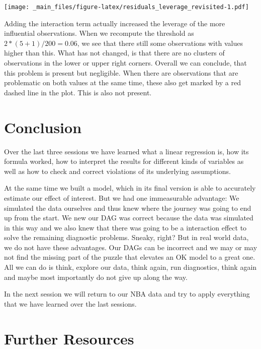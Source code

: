\documentclass[
]{book}
\begin{document}
\texttt{[image: \_main\_files/figure-latex/residuals\_leverage\_revisited-1.pdf]}

Adding the interaction term actually increased the leverage of the more
influential observations. When we recompute the threshold as
\(2 * (5 + 1) / 200 = 0.06\), we see that there still some observations with
values higher than this. What has not changed, is that there are no clusters
of observations in the lower or upper right corners. Overall we can conclude,
that this problem is present but negligible. When there are observations that
are problematic on both values at the same time, these also get marked by a red
dashed line in the plot. This is also not present.

\hypertarget{conclusion}{%
\section{Conclusion}\label{conclusion}}

Over the last three sessions we have learned what a linear regression is, how
its formula worked, how to interpret the results for different kinds of
variables as well as how to check and correct violations of its underlying
assumptions.

At the same time we built a model, which in its final version is able to
accurately estimate our effect of interest. But we had one immeasurable
advantage: We simulated the data ourselves and thus knew where the journey was
going to end up from the start. We new our DAG was correct because the data was
simulated in this way and we also knew that there was going to be a interaction
effect to solve the remaining diagnostic problems. Sneaky, right? But in real
world data, we do not have these advantages. Our DAGs can be incorrect and we
may or may not find the missing part of the puzzle that elevates an OK model to
a great one. All we can do is think, explore our data, think again, run
diagnostics, think again and maybe most importantly do not give up along the
way.

In the next session we will return to our NBA data and try to apply everything
that we have learned over the last sessions.

\hypertarget{further-resources-3}{%
\section{Further Resources}\label{further-resources-3}}
\end{document}
